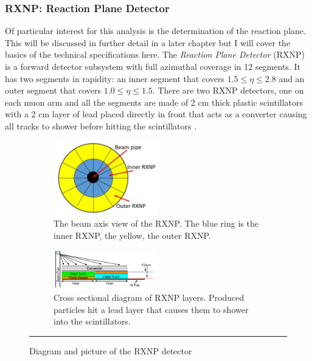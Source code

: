 \subsubsection{RXNP: Reaction Plane Detector}
Of particular interest for this analysis is the determination of the reaction plane. This will be discussed in further detail in a later chapter but I will cover the basics of the technical specifications here. The \textit{Reaction Plane Detector} (RXNP) is a forward detector subsystem \citep{RXNPfocus} with full azimuthal coverage in 12 segments. It has two segments in rapidity: an inner segment that covers $1.5 \leq \eta \leq 2.8$ and an outer segment that covers $1.0 \leq \eta \leq 1.5$. There are two RXNP detectors, one on each muon arm and all the segments are made of 2 cm thick plastic scintillators with a 2 cm layer of lead placed directly in front that acts as a converter causing all tracks to shower before hitting the scintillators \citep{RXNPfocusER}.  
\begin{figure}
\begin{subfigure}[b]{1\textwidth}
    \centering
    \includegraphics[width=0.5\textwidth]{Figures/RXNPdiagram.JPG}
    \caption{The beam axis view of the RXNP. The blue ring is the inner RXNP, the yellow, the outer RXNP.}

\end{subfigure}
\begin{subfigure}[b]{1\textwidth}
\centering
  \includegraphics[width=0.5\textwidth]{Figures/RXNPschem.jpg}
  \caption{Cross sectional diagram of RXNP layers. Produced particles hit a lead layer that causes them to shower into the scintillators.}
\end{subfigure}

  \rule{35em}{0.5pt}
\caption[Diagram and picture of the RXNP detector]{Diagram and picture of the RXNP detector}
      \label{fig:RXNP}
\end{figure}


